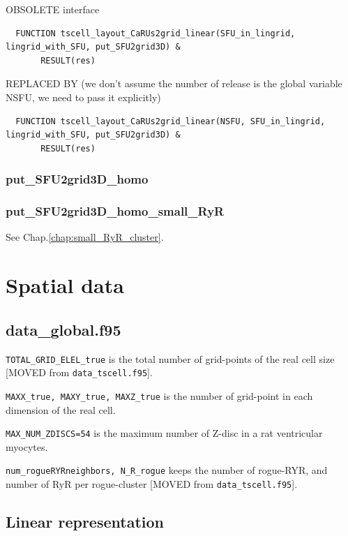 OBSOLETE interface
\begin{verbatim}
  FUNCTION tscell_layout_CaRUs2grid_linear(SFU_in_lingrid, lingrid_with_SFU, put_SFU2grid3D) &
       RESULT(res)
\end{verbatim}
REPLACED BY (we don't assume the number of release is the global variable NSFU,
we need to pass it explicitly)
\begin{verbatim}
  FUNCTION tscell_layout_CaRUs2grid_linear(NSFU, SFU_in_lingrid, lingrid_with_SFU, put_SFU2grid3D) &
       RESULT(res)
\end{verbatim}

\subsubsection{put\_SFU2grid3D\_homo}
\label{sec:put_SFU2grid3D_homo}


\subsubsection{put\_SFU2grid3D\_homo\_small\_RyR}
\label{sec:put_SFU2grid3D_homo_small_RyR}

See Chap.\ref{chap:small_RyR_cluster}.

\section{Spatial data}
\label{sec:spatial-data}

\subsection{data\_global.f95}

\verb!TOTAL_GRID_ELEL_true! is the total number of grid-points of the real cell
size [MOVED from \verb!data_tscell.f95!].

\verb!MAXX_true, MAXY_true, MAXZ_true! is the number of grid-point in each
dimension of the real cell.

\verb!MAX_NUM_ZDISCS=54! is the maximum number of Z-disc in a rat ventricular
myocytes.

\verb!num_rogueRYRneighbors, N_R_rogue! keeps the number of rogue-RYR, and
number of RyR per rogue-cluster [MOVED from \verb!data_tscell.f95!].


 

\subsection{Linear representation}
\label{sec:spatial-lineardata}

